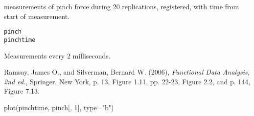 \begin{Description} measurements of pinch force during 20 replications, registered, with
time from start of measurement.
\end{Description}
\begin{Usage}
\begin{verbatim}
pinch
pinchtime
\end{verbatim}
\end{Usage}
\begin{Format}\relax
{}
\end{Format}
\begin{Details}\relax
Measurements every 2 milliseconds.
\end{Details}
\begin{Source}\relax
Ramsay, James O., and Silverman, Bernard W. (2006), \emph{Functional
Data Analysis, 2nd ed.}, Springer, New York, p. 13, Figure 1.11,
pp. 22-23, Figure 2.2, and p. 144, Figure 7.13.
\end{Source}
\begin{Examples}
\begin{ExampleCode}
  plot(pinchtime, pinch[, 1], type="b")
\end{ExampleCode}
\end{Examples}

